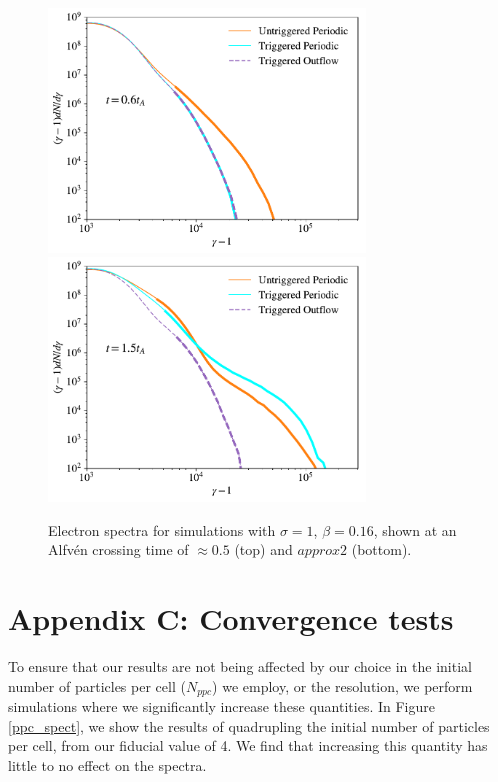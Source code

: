 \begin{figure}[!h]
\centering
\includegraphics[width =0.75\textwidth]{sig1_delgam_2_outflow_untriggered_earlytime.pdf}
\includegraphics[width =0.75\textwidth]{sig1_delgam_2_outflow_untriggered_latetime.pdf}
\caption{Electron spectra for simulations with $\sigma=1$, $\beta=0.16$, shown at an Alfv\'en crossing time of $\approx0.5$ (top) and $approx 2$ (bottom).}
\label{sig1_outflow_early}
\end{figure}




\section{Appendix C: Convergence tests}\label{convergence}
To ensure that our results are not being affected by our choice in the initial number of particles per cell ($N_{ppc}$) we employ, or the resolution, we perform simulations where we significantly increase these quantities.  In Figure \ref{ppc_spect}, we show the results of quadrupling the initial number of particles per cell, from our fiducial value of 4.  We find that increasing this quantity has little to no effect on the spectra.  

